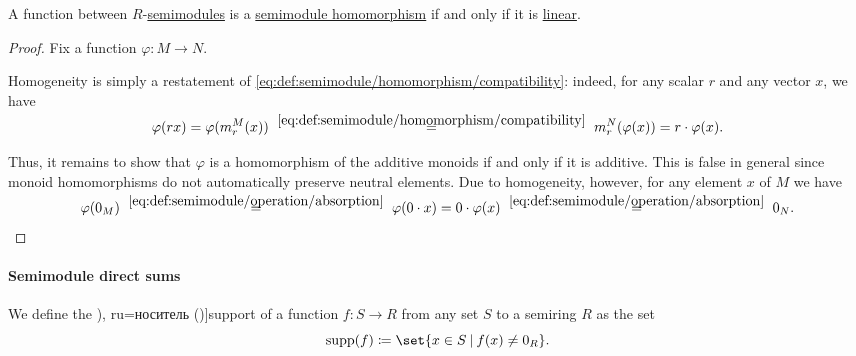 \begin{proposition}\label{thm:semimodule_homomorphism_iff_linear}
  A function between \( R \)-\hyperref[def:semimodule]{semimodules} is a \hyperref[def:semimodule/homomorphism]{semimodule homomorphism} if and only if it is \hyperref[def:linear_function]{linear}.
\end{proposition}
\begin{proof}
  Fix a function \( \varphi: M \to N \).

  Homogeneity is simply a restatement of \eqref{eq:def:semimodule/homomorphism/compatibility}: indeed, for any scalar \( r \) and any vector \( x \), we have
  \begin{equation}\label{eq:thm:semimodule_homomorphism_iff_linear/proof/homogeneity}
    \varphi(rx)
    =
    \varphi(m_r^M(x))
    \reloset{\eqref{eq:def:semimodule/homomorphism/compatibility}} =
     m_r^N(\varphi(x))
     =
     r \cdot \varphi(x).
  \end{equation}

  Thus, it remains to show that \( \varphi \) is a homomorphism of the additive monoids if and only if it is additive. This is false in general since monoid homomorphisms do not automatically preserve neutral elements. Due to homogeneity, however, for any element \( x \) of \( M \) we have
  \begin{equation*}
    \varphi(0_M)
    \reloset {\eqref{eq:def:semimodule/operation/absorption}} =
    \varphi(0 \cdot x)
    =
    0 \cdot \varphi(x)
    \reloset {\eqref{eq:def:semimodule/operation/absorption}} =
    0_N.
  \end{equation*}
\end{proof}

\paragraph{Semimodule direct sums}

\begin{definition}\label{def:function_support}
  We define the \term[bg=носител (\cite[58]{Боянов2008ЧислениМетоди}), ru=носитель (\cite[135]{КанторовичАкилов1984ФункциональныйАнализ})]{support} of a function \( f: S \to R \) from any set \( S \) to a semiring \( R \) as the set
  \begin{equation*}
    \supp(f) \coloneqq \set{ x \in S \given f(x) \neq 0_R }.
  \end{equation*}
\end{definition}

